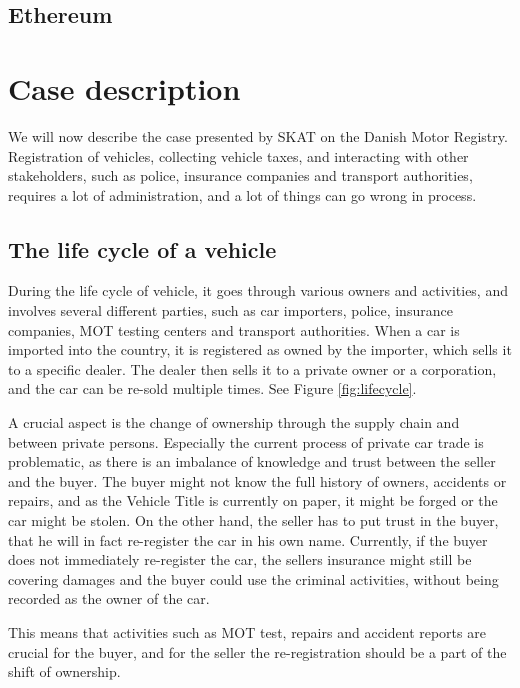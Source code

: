 \documentclass[oneside,a4paper,10pts,article]{memoir}
\begin{document}
\section{Ethereum}
\cite{buterin2013ethereum, wood2014ethereum}


\chapter{Case description}
\label{sec:case}
We will now describe the case presented by SKAT on the Danish Motor
Registry. Registration of vehicles, collecting vehicle taxes, and
interacting with other stakeholders, such as police, insurance
companies and transport authorities, requires a lot of administration,
and a lot of things can go wrong in process.

\section{The life cycle of a vehicle}
During the life cycle of vehicle, it goes through various owners and
activities, and involves several different parties, such as car
importers, police, insurance companies, MOT testing centers and
transport authorities. When a car is imported into the country, it is
registered as owned by the importer, which sells it to a specific
dealer. The dealer then sells it to a private owner or a corporation,
and the car can be re-sold multiple times. See Figure \ref{fig:lifecycle}.

A crucial aspect is the change of ownership through the supply chain
and between private persons. Especially the current process of private
car trade is problematic, as there is an imbalance of knowledge and
trust between the seller and the buyer. The buyer might not know the
full history of owners, accidents or repairs, and as the Vehicle Title
is currently on paper, it might be forged or the car might be
stolen. On the other hand, the seller has to put trust in the buyer,
that he will in fact re-register the car in his own name. Currently,
if the buyer does not immediately re-register the car, the sellers
insurance might still be covering damages and the buyer could use the
criminal activities, without being recorded as the owner of the car.

This means that activities such as MOT test, repairs and accident
reports are crucial for the buyer, and for the seller the
re-registration should be a part of the shift of ownership.
\end{document}
